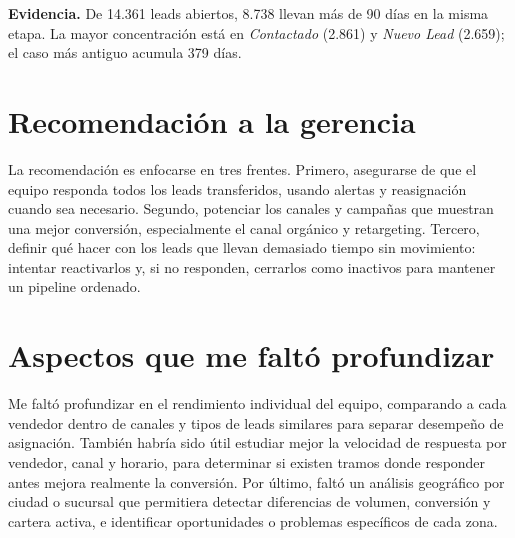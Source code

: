 \documentclass[11pt,a4paper]{article}
\begin{document}
\textbf{Evidencia.}
De 14.361 leads abiertos, 8.738 llevan más de 90 días en la misma etapa. La mayor concentración está en \textit{Contactado} (2.861) y \textit{Nuevo Lead} (2.659); el caso más antiguo acumula 379 días.

\section*{Recomendación a la gerencia}

La recomendación es enfocarse en tres frentes. Primero, asegurarse de que el equipo responda todos los leads transferidos, usando alertas y reasignación cuando sea necesario. Segundo, potenciar los canales y campañas que muestran una mejor conversión, especialmente el canal orgánico y retargeting. Tercero, definir qué hacer con los leads que llevan demasiado tiempo sin movimiento: intentar reactivarlos y, si no responden, cerrarlos como inactivos para mantener un pipeline ordenado.

\section*{Aspectos que me faltó profundizar}

Me faltó profundizar en el rendimiento individual del equipo, comparando a cada vendedor dentro de canales y tipos de leads similares para separar desempeño de asignación. También habría sido útil estudiar mejor la velocidad de respuesta por vendedor, canal y horario, para determinar si existen tramos donde responder antes mejora realmente la conversión. Por último, faltó un análisis geográfico por ciudad o sucursal que permitiera detectar diferencias de volumen, conversión y cartera activa, e identificar oportunidades o problemas específicos de cada zona.
\end{document}
